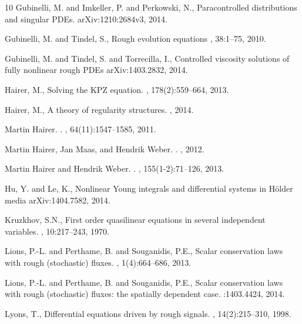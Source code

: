\documentclass[11pt,a4paper]{amsart}
\numberwithin{equation}{section} %
\begin{document}
\begin{thebibliography}{10}
Gubinelli, M. and Imkeller, P. and Perkowski, N.,
\newblock Paracontrolled distributions and singular {PDE}s.
\newblock arXiv:1210:2684v3, 2014.

Gubinelli, M. and Tindel, S.,
\newblock Rough evolution equations
,  38:1--75, 2010.

Gubinelli, M. and Tindel, S. and Torrecilla, I.,
\newblock Controlled viscosity solutions of fully nonlinear rough {PDE}s
\newblock arXiv:1403.2832, 2014.

Hairer, M.,
\newblock Solving the KPZ equation.
, 178(2):559--664, 2013.

Hairer, M.,
\newblock A theory of regularity structures.
, 2014.


Martin Hairer.
.
, 64(11):1547--1585, 2011.

Martin Hairer, Jan Maas, and Hendrik Weber.
.
, 2012.

Martin Hairer and Hendrik Weber.
.
, 155(1-2):71--126, 2013.


 Hu, Y. and Le, K.,
 \newblock Nonlinear Young integrals and differential systems in H\"older media
 \newblock arXiv:1404.7582, 2014.
 
Kruzkhov, S.N.,
\newblock First order quasilinear equations in several independent variables.
, 10:217--243, 1970.


Lions, P.-L. and Perthame, B. and Souganidis, P.E.,
\newblock Scalar conservation laws with rough (stochastic) fluxes.
, 1(4):664--686, 2013.

Lions, P.-L. and Perthame, B. and Souganidis, P.E.,
\newblock Scalar conservation laws with rough (stochastic) fluxes: the spatially dependent case.
:1403.4424, 2014.


Lyons, T.,  
\newblock Differential equations driven by rough signals.
, 14(2):215--310, 1998. 



\end{thebibliography}
\end{document}
